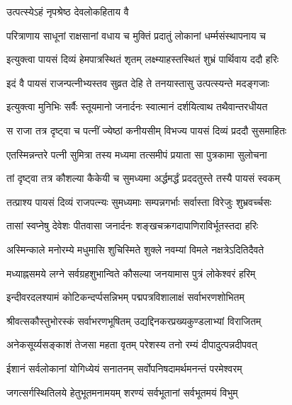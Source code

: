 
\onelineshloka
{उत्पत्स्येऽहं नृपश्रेष्ठ देवलोकहिताय वै}%

\twolineshloka
{परित्राणाय साधूनां राक्षसानां वधाय च}
{मुक्तिं प्रदातुं लोकानां धर्म्मसंस्थापनाय च}%


\twolineshloka
{इत्युक्त्वा पायसं दिव्यं हेमपात्रस्थितं शृतम्}
{लक्ष्म्याहस्तस्थितं शुभ्रं पार्थिवाय ददौ हरिः}%


\twolineshloka
{इदं वै पायसं राजन्पत्नीभ्यस्तव सुव्रत}
{देहि ते तनयास्तासु उत्पत्स्यन्ते मदङ्गजाः}%


\twolineshloka
{इत्युक्त्वा मुनिभिः सर्वैः स्तूयमानो जनार्दनः}
{स्वात्मानं दर्शयित्वाथ तथैवान्तरधीयत}%

\twolineshloka
{स राजा तत्र दृष्ट्वा च पत्नीं ज्येष्ठां कनीयसीम्}
{विभज्य पायसं दिव्यं प्रददौ सुसमाहितः}%

\twolineshloka
{एतस्मिन्नन्तरे पत्नी सुमित्रा तस्य मध्यमा}
{तत्समीपं प्रयाता सा पुत्रकामा सुलोचना}%

\twolineshloka
{तां दृष्ट्वा तत्र कौशल्या कैकेयी च सुमध्यमा}
{अर्द्धमर्द्धं प्रददतुस्ते तस्यै पायसं स्वकम्}%

\twolineshloka
{तत्प्राश्य पायसं दिव्यं राजपत्न्यः सुमध्यमाः}
{सम्पन्नगर्भाः सर्वास्ता विरेजुः शुभ्रवर्च्चसः}%

\twolineshloka
{तासां स्वप्नेषु देवेशः पीतवासा जनार्दनः}
{शङ्खचक्रगदापाणिराविर्भूतस्तदा हरिः}%

\twolineshloka
{अस्मिन्काले मनोरम्ये मधुमासि शुचिस्मिते}
{शुक्ले नवम्यां विमले नक्षत्रेऽदितिदैवते}%

\twolineshloka
{मध्याह्नसमये लग्ने सर्वग्रहशुभान्विते}
{कौसल्या जनयामास पुत्रं लोकेश्वरं हरिम्}%

\twolineshloka
{इन्दीवरदलश्यामं कोटिकन्दर्प्पसन्निभम्}
{पद्मपत्रविशालाक्षं सर्वाभरणशोभितम्}%

\twolineshloka
{श्रीवत्सकौस्तुभोरस्कं सर्वाभरणभूषितम्}
{उद्यद्दिनकरप्रख्यकुण्डलाभ्यां विराजितम्}%

\twolineshloka
{अनेकसूर्य्यसङ्काशं तेजसा महता वृतम्}
{परेशस्य तनो रम्यं दीपादुत्पन्नदीपवत्}%

\twolineshloka
{ईशानं सर्वलोकानां योगिध्येयं सनातनम्}
{सर्वोपनिषदामर्थमनन्तं परमेश्वरम्}%

\twolineshloka
{जगत्सर्गस्थितिलये हेतुभूतमनामयम्}
{शरण्यं सर्वभूतानां सर्वभूतमयं विभुम्}%

